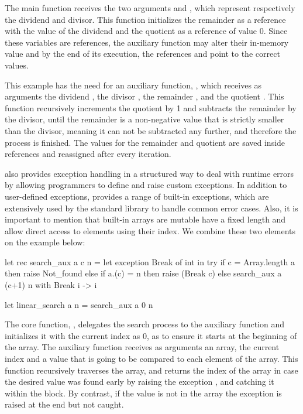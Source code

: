 The main function  receives the two arguments  and , which represent respectively
the dividend and divisor. This function initializes the remainder  as a reference with the value of the dividend 
 and the quotient  as a reference of value 0. Since these variables are references, the auxiliary function
may alter their in-memory value and by the end of its execution, the references  and  point to the correct 
values.

This example has the need for an auxiliary function, , which receives as arguments the dividend 
, the divisor , the remainder , and the quotient . This function recursively
increments the quotient by 1 and subtracts the remainder by the divisor, until the remainder 
is a non-negative value that is strictly smaller than the divisor, meaning it can not be subtracted any further, and therefore the 
process is finished. The values for the remainder and quotient are saved inside references and reassigned after every iteration.

\ocaml also provides exception handling in a structured way to deal with runtime errors by allowing programmers to define 
and raise custom exceptions. In addition to user-defined exceptions, \ocaml provides a range of built-in exceptions, which are 
extensively used by the standard library to handle common error cases. Also, it is important to mention that built-in arrays are mutable
have a fixed length and allow direct access to elements using their index. We combine these two elements on the example below:

\begin{ocamlenv}
let rec search_aux a c n =
  let exception Break of int in try
    if c = Array.length a then raise Not_found 
    else if a.(c) = n then raise (Break c) 
    else search_aux a (c+1) n
  with Break i -> i

let linear_search a n = search_aux a 0 n
\end{ocamlenv}
\label{subsec:SearchCode}

The core function, , delegates the search process to the auxiliary function and initializes it with the current
index as 0, as to ensure it starts at the beginning of the array. The auxiliary function  receives as arguments 
an array, the current index and a value that is going to be 
compared to each element of the array. This function recursively traverses the array, and returns the index of the array in case the desired 
value was found early by raising the exception , and catching it within the  block. By contrast, 
if the value is not in the array the exception  is raised at the end but not caught.

